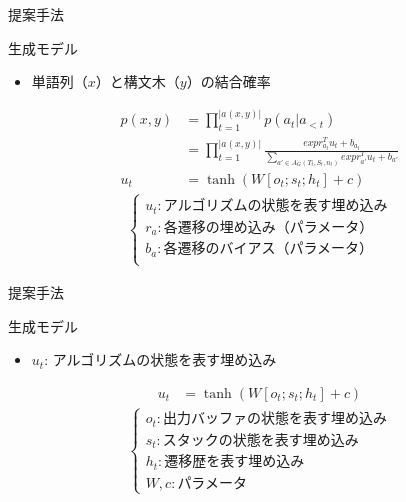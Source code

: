 \documentclass[aspectratio=43,unicode,10pt]{beamer}
\begin{document}
\begin{frame}{提案手法}
  \begin{block}{生成モデル}
    \begin{itemize}
      \item 単語列（$x$）と構文木（$y$）の結合確率
    \end{itemize}
    \begin{align*}
      p(x, y) & = \prod_{t=1}^{|a(x, y)|} p(a_t | a_{<t}) \\
              & = \prod_{t=1}^{|a(x, y)|}
                  \frac{exp r_{a_t}^T u_t + b_{a_t}}
                      {\sum_{a' \in A_G(T_t, S_t, n_t)}
                        exp r_{a'}^T u_t + b_{a'}} \\
      u_t & = \tanh (W[o_t; s_t; h_t] + c)
    \end{align*}
    \begin{gather*}
      \begin{cases}
        u_t: \text{アルゴリズムの状態を表す埋め込み} \\
        r_a: \text{各遷移の埋め込み（パラメータ）} \\
        b_a: \text{各遷移のバイアス（パラメータ）} \\
      \end{cases}
    \end{gather*}
  \end{block}
\end{frame}

\begin{frame}{提案手法}
  \begin{block}{生成モデル}
    \begin{itemize}
      \item $u_t$: アルゴリズムの状態を表す埋め込み
    \end{itemize}
    \begin{align*}
      u_t & = \tanh (W[o_t; s_t; h_t] + c)
    \end{align*}
    \begin{gather*}
      \begin{cases}
        o_t: \text{出力バッファの状態を表す埋め込み} \\
        s_t: \text{スタックの状態を表す埋め込み} \\
        h_t: \text{遷移歴を表す埋め込み} \\
        W, c: \text{パラメータ}
      \end{cases}
    \end{gather*}
  \end{block}
\end{frame}
\end{document}
